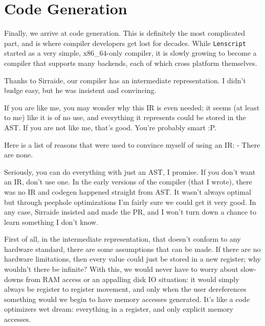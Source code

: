\documentclass[12pt]{report}
\newcommand{\langname}{Lenscript}
\newcommand{\lang}{\texttt{\langname} }
\begin{document}
\chapter{Code Generation}
\label{ch:codegen}

Finally, we arrive at code generation. This is definitely the most complicated part, and is where compiler developers get lost for decades. While \lang started as a very simple, x86\_64-only compiler, it is slowly growing to become a compiler that supports many backends, each of which cross platform themselves.

Thanks to Sirraide, our compiler has an intermediate representation. I didn't budge easy, but he was insistent and convincing.

If you are like me, you may wonder why this IR is even needed; it seems (at least to me) like it is of no use, and everything it represents could be stored in the AST. If you are not like me, that's good. You're probably smart :P.

Here is a list of reasons that were used to convince myself of using an IR:
- There are none.

Seriously, you can do everything with just an AST, I promise. If you don't want an IR, don't use one. In the early versions of the compiler (that I wrote), there was no IR and codegen happened straight from AST. It wasn't always optimal but through peephole optimizations I'm fairly sure we could get it very good. In any case, Sirraide insisted and made the PR, and I won't turn down a chance to learn something I don't know.

First of all, in the intermediate representation, that doesn't conform to any hardware standard, there are some assumptions that can be made. If there are no hardware limitations, then every value could just be stored in a new register; why wouldn't there be infinite? With this, we would never have to worry about slow-downs from RAM access or an appalling disk IO situation: it would simply always be register to register movement, and only when the user dereferences something would we begin to have memory accesses generated. It's like a code optimizers wet dream: everything in a register, and only explicit memory accesses.

\end{document}
